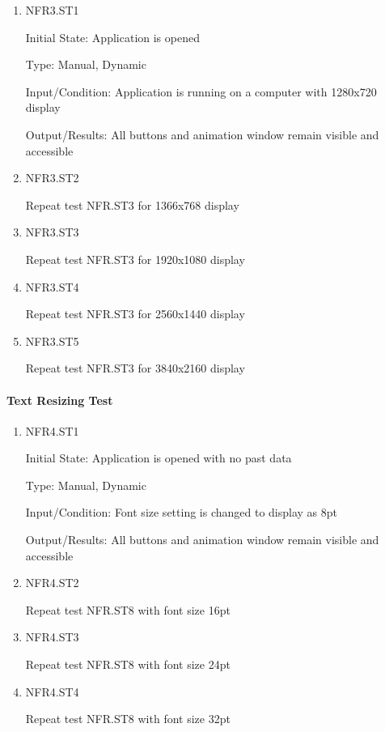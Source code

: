 \documentclass[12pt, titlepage]{article}
\begin{document}
\begin{enumerate}

\item{NFR3.ST1\\}

Initial State: Application is opened

Type: Manual, Dynamic

Input/Condition: Application is running on a computer with 1280x720 display

Output/Results: All buttons and animation window remain visible and accessible

\item{NFR3.ST2\\}

Repeat test NFR.ST3 for 1366x768 display

\item{NFR3.ST3\\}

Repeat test NFR.ST3 for 1920x1080 display

\item{NFR3.ST4\\}

Repeat test NFR.ST3 for 2560x1440 display

\item{NFR3.ST5\\}

Repeat test NFR.ST3 for 3840x2160 display

\end{enumerate}

\paragraph{Text Resizing Test}

\begin{enumerate}

\item{NFR4.ST1\\}

Initial State: Application is opened with no past data

Type: Manual, Dynamic

Input/Condition: Font size setting is changed to display as 8pt

Output/Results: All buttons and animation window remain visible and accessible

\item{NFR4.ST2\\}

Repeat test NFR.ST8 with font size 16pt

\item{NFR4.ST3\\}

Repeat test NFR.ST8 with font size 24pt

\item{NFR4.ST4\\}

Repeat test NFR.ST8 with font size 32pt

\end{enumerate}
\end{document}
